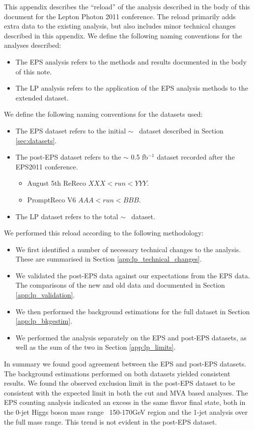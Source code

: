 
This appendix describes the ``reload'' of the analysis described in the body
of this document for the Lepton Photon 2011 conference.
The reload primarily adds extra data to the existing analysis, but also 
includes minor technical changes described in this appendix.
We define the following naming conventions for the analyses described:

\begin{itemize}
    \item The EPS analysis refers to the methods and results documented in the body of this note.
    \item The LP analysis refers to the application of the EPS analysis methods to the extended dataset.
\end{itemize}

We define the following naming conventions for the datasets used:

\begin{itemize}
    \item The EPS dataset refers to the initial $\sim$ \intlumi~dataset described in Section \ref{sec:datasets}.
    \item The post-EPS dataset refers to the $\sim$ 0.5 fb$^{-1}$ dataset recorded after the EPS2011 conference.
    \begin{itemize}
        \item August 5th ReReco $XXX<run<YYY$.
        \item PromptReco V6 $AAA<run<BBB$.
    \end{itemize}
    \item The LP dataset refers to the total $\sim$ \lpintlumi~dataset.
\end{itemize}

We performed this reload according to the following methodology:

\begin{itemize}
    \item We first identified a number of necessary technical changes to the analysis.  
These are summarised in Section \ref{app:lp_technical_changes}.
    \item We validated the post-EPS data against our expectations from the EPS data.
The comparisons of the new and old data and documented in Section \ref{app:lp_validation}.
    \item We then performed the background estimations for the full dataset in Section \ref{app:lp_bkgestim}.
    \item We performed the analysis separately on the EPS and post-EPS datasets, 
as well as the sum of the two in Section \ref{app:lp_limits}.
\end{itemize}

In summary we found good agreement between the EPS and post-EPS datasets.  
The background estimations performed on both datasets yielded consistent results.
We found the observed exclusion limit in the post-EPS dataset to be consistent
with the expected limit in both the cut and MVA based analyses.
The EPS counting analysis indicated an excess in the same flavor final state, 
both in the 0-jet Higgs boson mass range ~150-170GeV region 
and the 1-jet analysis over the full mass range.
This trend is not evident in the post-EPS dataset.

